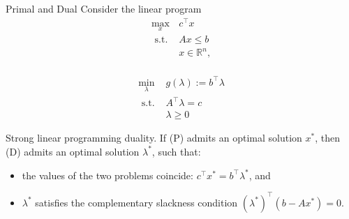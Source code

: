 \begin{remark}[L3.3]{Primal and Dual}
    Consider the linear program
    \vspace{-5pt}\\
    \begin{equation}
        \begin{array}{cl}
            \max _x & c^{\top} x \\
            \text { s.t. } & A x \leq b \\ 
            & x \in \mathbb{R}^n,
        \end{array}\tag{P}
    \end{equation}
    \vspace{-5pt}\\
    \begin{equation}
        \begin{array}{cl}
            \min _\lambda & g(\lambda):=b^{\top} \lambda \\
            \text { s.t. } & A^{\top} \lambda=c \\
            & \lambda \geq 0
        \end{array}\tag{D}
    \end{equation}
    \vspace{-5pt}
\end{remark}

\begin{theorem}[L3.2]{Strong linear programming duality.}
    If (P) admits an optimal solution $x^*$, then (D) admits an optimal solution $\lambda^*$, such that:
    \begin{itemize}[leftmargin=*]
        \item the values of the two problems coincide: $c^{\top} x^*=b^{\top} \lambda^*$, and
        \item $\lambda^*$ satisfies the complementary slackness condition $(\lambda^*)^{\top}(b-A x^*)=0$.
    \end{itemize} 
\end{theorem}



